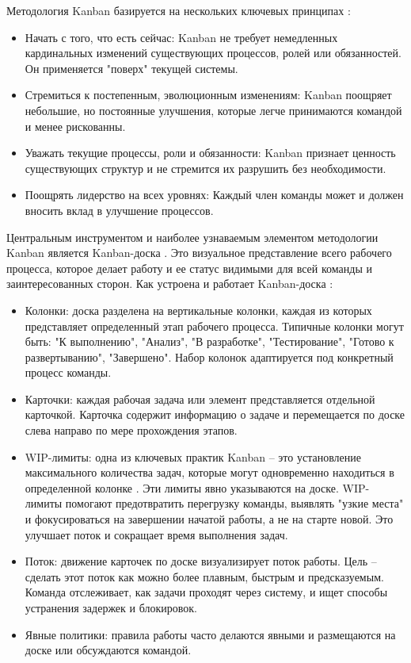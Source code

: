 Методология Kanban базируется на нескольких ключевых принципах \cite{website_kanbanuniversity1}:
\begin{itemize}
	\item Начать с того, что есть сейчас: Kanban не требует немедленных кардинальных изменений существующих процессов, ролей или обязанностей. Он применяется "поверх" текущей системы.
	\item Стремиться к постепенным, эволюционным изменениям: Kanban поощряет небольшие, но постоянные улучшения, которые легче принимаются командой и менее рискованны.
	\item Уважать текущие процессы, роли и обязанности: Kanban признает ценность существующих структур и не стремится их разрушить без необходимости.
	\item Поощрять лидерство на всех уровнях: Каждый член команды может и должен вносить вклад в улучшение процессов.
\end{itemize}

Центральным инструментом и наиболее узнаваемым элементом методологии Kanban является Kanban-доска \cite{kanban2}. Это визуальное представление всего рабочего процесса, которое делает работу и ее статус видимыми для всей команды и заинтересованных сторон.
Как устроена и работает Kanban-доска \cite{kanban3}:
\begin{itemize}
	\item Колонки: доска разделена на вертикальные колонки, каждая из которых представляет определенный этап рабочего процесса. Типичные колонки могут быть: "К выполнению", "Анализ", "В разработке", "Тестирование", "Готово к развертыванию", "Завершено". Набор колонок адаптируется под конкретный процесс команды.
	\item Карточки: каждая рабочая задача или элемент представляется отдельной карточкой. Карточка содержит информацию о задаче и перемещается по доске слева направо по мере прохождения этапов.
	\item WIP-лимиты: одна из ключевых практик Kanban – это установление максимального количества задач, которые могут одновременно находиться в определенной колонке \cite{kanban1}. Эти лимиты явно указываются на доске. WIP-лимиты помогают предотвратить перегрузку команды, выявлять "узкие места" и фокусироваться на завершении начатой работы, а не на старте новой. Это улучшает поток и сокращает время выполнения задач.
	\item Поток: движение карточек по доске визуализирует поток работы. Цель – сделать этот поток как можно более плавным, быстрым и предсказуемым. Команда отслеживает, как задачи проходят через систему, и ищет способы устранения задержек и блокировок.
	\item Явные политики: правила работы часто делаются явными и размещаются на доске или обсуждаются командой.
\end{itemize}

